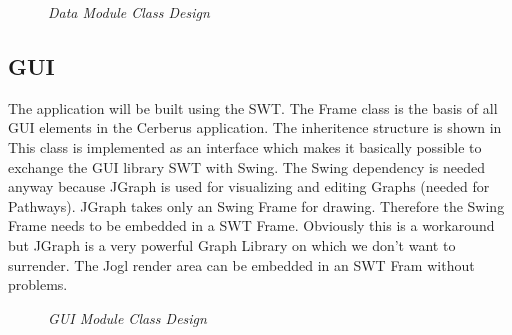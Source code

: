 \begin{figure}[ht]
\centering
{} 
\caption[Data Module Class Design]{\textit{Data Module Class Design}} 
\label{gfx:data_module_class_design}
\end{figure}

\subsection{GUI}

The application will be built using the SWT. 
The Frame class is the basis of all GUI elements in the Cerberus application.
The inheritence structure is shown in  
This class is implemented as an interface which makes it basically possible to exchange the GUI library SWT with Swing.
The Swing dependency is needed anyway because JGraph is used for visualizing and editing Graphs (needed for Pathways).
JGraph takes only an Swing Frame for drawing. Therefore the Swing Frame needs to be embedded in a SWT Frame.
Obviously this is a workaround but JGraph is a very powerful Graph Library on which we don't want to surrender.
The Jogl render area can be embedded in an SWT Fram without problems.

\begin{figure}[ht]
\centering
{} 
\caption[GUI Module Class Design]{\textit{GUI Module Class Design}} 
\label{gfx:gui_module_class_design}
\end{figure}

